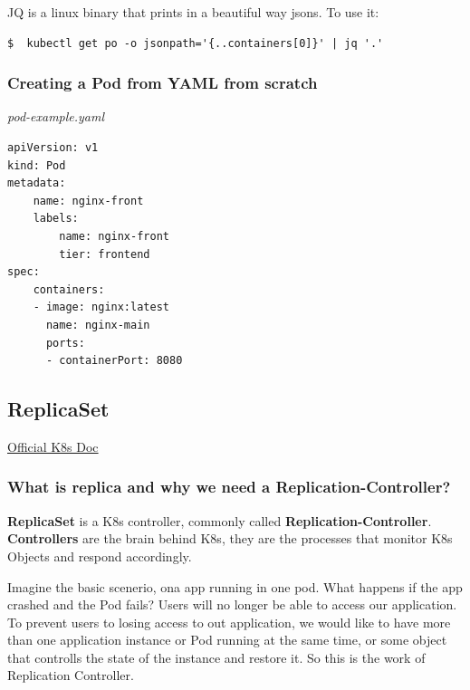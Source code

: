\documentclass{article}
\newenvironment{blocktemplateI}[1]{%
    \tcolorbox[beamer,%
    noparskip,breakable,
    colframe=Violet,%
    colbacklower=Black,%
    title=#1]}%
    {\endtcolorbox}
\newenvironment{codetemplate}[1][]{%
  \mybasecolorbox[#1]
  \itshape
}{%
  \endmybasecolorbox
}
\begin{document}
\begin{blocktemplateI}{JQ}
JQ is a linux binary that prints in a beautiful way jsons. To use it:

\begin{codetemplate}{}
\begin{verbatim}
$  kubectl get po -o jsonpath='{..containers[0]}' | jq '.'
\end{verbatim}
\end{codetemplate}
\end{blocktemplateI}

\subsubsection{Creating a Pod from YAML from scratch}

\begin{codetemplate}{pod-example.yaml}
\begin{verbatim}
apiVersion: v1
kind: Pod
metadata:
    name: nginx-front
    labels:
        name: nginx-front
        tier: frontend
spec:
    containers: 
    - image: nginx:latest
      name: nginx-main
      ports:
      - containerPort: 8080
\end{verbatim}
\end{codetemplate}

\subsection{ReplicaSet}

\href{https://kubernetes.io/docs/concepts/workloads/controllers/replicaset/}{Official K8s Doc}

\subsubsection{What is replica and why we need a Replication-Controller?}

\textbf{ReplicaSet} is a K8s controller, commonly called \textbf{Replication-Controller}. \textbf{Controllers} are the brain behind K8s, they are the processes that monitor K8s Objects and respond accordingly.

Imagine the basic scenerio, ona app running in one pod. What happens if the app crashed and the Pod fails? Users will no longer be able to access our application. To prevent users to losing access to out application, we would like to have more than one application instance or Pod running at the same time, or some object that controlls the state of the instance and restore it. So this is the work of Replication Controller.
\end{document}
